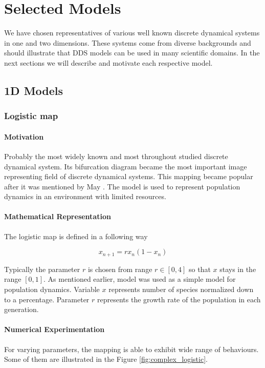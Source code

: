 \chapter{Selected Models}
We have chosen representatives of various well known discrete dynamical systems in one and two dimensions. These systems come from diverse backgrounds and should illustrate that DDS models can be used in many scientific domains. In the next sections we will describe and motivate each respective model.

\section{1D Models}

\subsection{Logistic map}
\label{subsec:logistic map}

\subsubsection{Motivation}
Probably the most widely known and most throughout studied discrete dynamical system.
Its bifurcation diagram became the most important image representing field of discrete dynamical systems.
This mapping became popular after it was mentioned by May \cite{May19760610}.
The model is used to represent population dynamics in an environment with limited resources.

\subsubsection{Mathematical Representation}
The logistic map is defined in a following way

\begin{equation}
    x_{n+1} = r x_{n} ( 1 - x_{n} )
\end{equation}

Typically the parameter $r$ is chosen from range $r \in [0, 4]$ so that $x$ stays in the range $[0,1]$.
As mentioned earlier, model was used as a simple model for population dynamics.
Variable $x$ represents number of species normalized down to a percentage.
Parameter $r$ represents the growth rate of the population in each generation.

\subsubsection{Numerical Experimentation}
For varying parameters, the mapping is able to exhibit wide range of behaviours.
Some of them are illustrated in the Figure \ref{fig:complex_logistic}.

